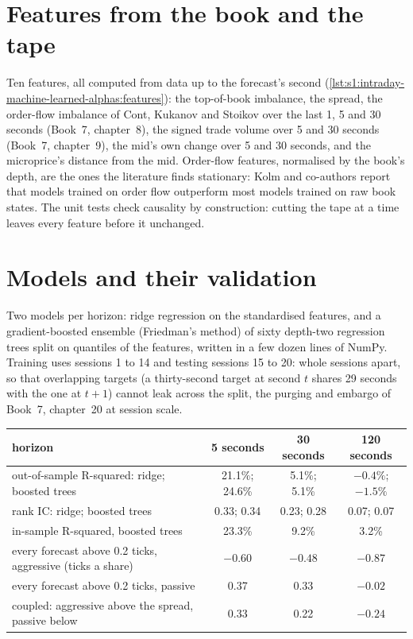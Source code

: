 \section{Features from the book and the tape}

Ten features, all computed from data up to the forecast's second (\cref{lst:s1:intraday-machine-learned-alphas:features}): the top-of-book imbalance, the
spread, the order-flow imbalance of Cont, Kukanov and Stoikov over the last 1, 5 and 30 seconds (Book~7, chapter~8), the signed trade volume over 5 and 30
seconds (Book~7, chapter~9), the mid's own change over 5 and 30 seconds, and the microprice's distance from the mid. Order-flow features, normalised by the
book's depth, are the ones the literature finds stationary: Kolm and co-authors report that models trained on order flow outperform most models trained on
raw book states. The unit tests check causality by construction: cutting the tape at a time leaves every feature before it unchanged.

\section{Models and their validation}

Two models per horizon: ridge regression on the standardised features, and a gradient-boosted ensemble (Friedman's method) of sixty depth-two regression
trees split on quantiles of the features, written in a few dozen lines of NumPy. Training uses sessions 1 to 14 and testing sessions 15 to 20: whole sessions
apart, so that overlapping targets (a thirty-second target at second $t$ shares 29 seconds with the one at $t + 1$) cannot leak across the split, the purging
and embargo of Book~7, chapter~20 at session scale.

\begin{center}
\small
\begin{tabular}{@{}lccc@{}}
\toprule
horizon & 5 seconds & 30 seconds & 120 seconds\\
\midrule
out-of-sample R-squared: ridge; boosted trees & 21.1\%; 24.6\% & 5.1\%; 5.1\% & $-0.4\%$; $-1.5\%$\\
rank IC: ridge; boosted trees & 0.33; 0.34 & 0.23; 0.28 & 0.07; 0.07\\
in-sample R-squared, boosted trees & 23.3\% & 9.2\% & 3.2\%\\
\midrule
every forecast above 0.2 ticks, aggressive (ticks a share) & $-0.60$ & $-0.48$ & $-0.87$\\
every forecast above 0.2 ticks, passive & 0.37 & 0.33 & $-0.02$\\
coupled: aggressive above the spread, passive below & 0.33 & 0.22 & $-0.24$\\
\bottomrule
\end{tabular}
\end{center}

